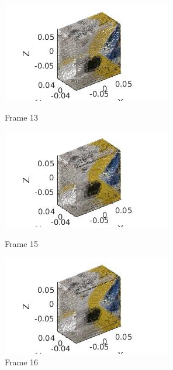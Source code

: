 \documentclass[10pt,a4paper]{article}
\begin{document}
\vspace{-30pt}
\hspace{-40pt}
\begin{figure}[!h]
	\begin{minipage}[t]{0.33 \linewidth}
		
		\centering
		\includegraphics[scale=0.5]{box/13.jpg}
		\caption{ \small Frame 13}
	\end{minipage}
	\begin{minipage}[t]{0.33 \linewidth}
		\centering
		\includegraphics[scale=0.5]{box/15.jpg}
		\caption{ \small Frame 15}
	\end{minipage}
	\begin{minipage}[t]{0.33 \linewidth}
		\centering
		\includegraphics[scale=0.5]{box/16.jpg}
		\caption{ \small Frame 16}
	\end{minipage}
\end{figure}
\end{document}
